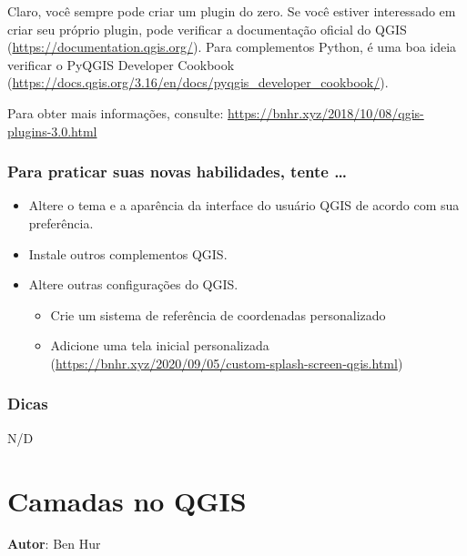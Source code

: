 \documentclass[
]{book}
\providecommand{\tightlist}{%
  \setlength{\itemsep}{0pt}\setlength{\parskip}{0pt}}
\begin{document}
Claro, você sempre pode criar um plugin do zero. Se você estiver interessado em criar seu próprio plugin, pode verificar a documentação oficial do QGIS (\url{https://documentation.qgis.org/}). Para complementos Python, é uma boa ideia verificar o PyQGIS Developer Cookbook (\href{https://docs.qgis.org/3.16/en/docs/pyqgis_developer_cookbook\%20/}{https://docs.qgis.org/3.16/en/docs/pyqgis\_developer\_cookbook/}).

Para obter mais informações, consulte: \href{https://bnhr.xyz/2018/10/08/qgis-plugins-3.0.\%20html}{https://bnhr.xyz/2018/10/08/qgis-plugins-3.0.html}

\hypertarget{para-praticar-suas-novas-habilidades-tente-1}{%
\subsection{Para praticar suas novas habilidades, tente \ldots{}}\label{para-praticar-suas-novas-habilidades-tente-1}}

\begin{itemize}
\tightlist
\item
  Altere o tema e a aparência da interface do usuário QGIS de acordo com sua preferência.
\item
  Instale outros complementos QGIS.
\item
  Altere outras configurações do QGIS.

  \begin{itemize}
  \tightlist
  \item
    Crie um sistema de referência de coordenadas personalizado
  \item
    Adicione uma tela inicial personalizada (\href{https://bnhr.xyz/2020/09/05/custom-splash\%20-screen-qgis.html}{https://bnhr.xyz/2020/09/05/custom-splash-screen-qgis.html})
  \end{itemize}
\end{itemize}

\hypertarget{dicas-1}{%
\subsection{Dicas}\label{dicas-1}}

N/D

\hypertarget{camadas-no-qgis}{%
\chapter{Camadas no QGIS}\label{camadas-no-qgis}}

\textbf{Autor}: Ben Hur
\end{document}
